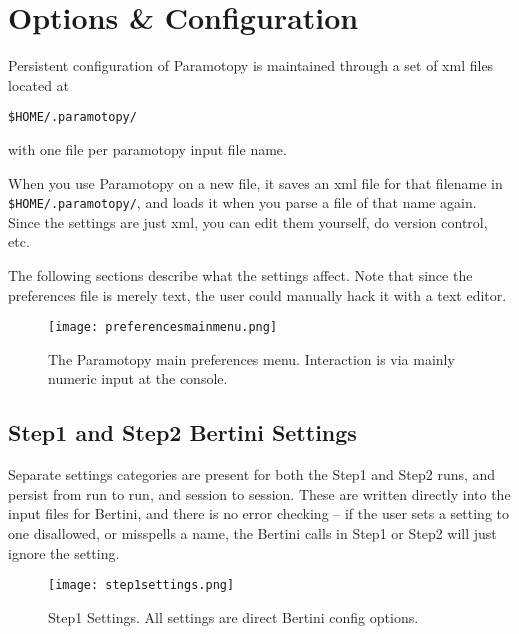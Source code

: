 \clearpage
\section{Options \& Configuration}
\label{sec:options}

Persistent configuration of Paramotopy is maintained through a set of xml files located at {\begin{center}\texttt{\$HOME/.paramotopy/} \end{center}} \noindent with one file per paramotopy input file name.   

When you use Paramotopy on a new file, it saves an xml file for that filename in \texttt{\$HOME/.paramotopy/}, and loads it when you parse a file of that name again.  Since the settings are just xml, you can edit them yourself, do version control, etc.

The following sections describe what the settings affect.  Note that since the preferences file is merely text, the user could manually hack it with a text editor.


\begin{figure}[h]
\begin{center}
\texttt{[image: preferencesmainmenu.png]}
\caption[Preferences Main Menu]{The Paramotopy main preferences menu.  Interaction is via mainly numeric input at the console.}
\label{screen:prefsmainmenu}
\end{center}
\end{figure}


\subsection{Step1 and Step2 Bertini Settings}

Separate settings categories are present for both the Step1 and Step2 runs, and persist from run to run, and session to session.  These are written directly into the input files for Bertini, and there is no error checking -- if the user sets a setting to one disallowed, or misspells a name, the Bertini calls in Step1 or Step2 will just ignore the setting.

\begin{figure}[h]
\begin{center}
\texttt{[image: step1settings.png]}
\caption[Step 1 Settings]{Step1 Settings.  All settings are direct Bertini config options.}
\label{screen:step1menu}
\end{center}
\end{figure}

